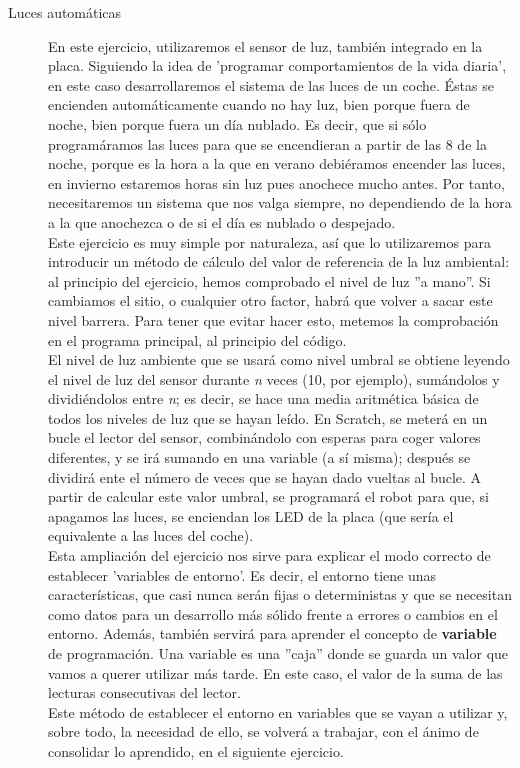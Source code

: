 \begin{description}
\item[Luces automáticas]\label{ej:lucesAuto}
En este ejercicio, utilizaremos el sensor de luz, también integrado en la placa. Siguiendo la idea de 'programar comportamientos de la vida diaria', en este caso desarrollaremos el sistema de las luces de un coche. Éstas se encienden automáticamente cuando no hay luz, bien porque fuera de noche, bien porque fuera un día nublado. Es decir, que si sólo programáramos las luces para que se encendieran a partir de las 8 de la noche, porque es la hora a la que en verano debiéramos encender las luces, en invierno estaremos horas sin luz pues anochece mucho antes. Por tanto, necesitaremos un sistema que nos valga siempre, no dependiendo de la hora a la que anochezca o de si el día es nublado o despejado. \\
Este ejercicio es muy simple por naturaleza, así que lo utilizaremos para introducir un método de cálculo del valor de referencia de la luz ambiental:
al principio del ejercicio, hemos comprobado el nivel de luz ''a mano''. Si cambiamos el sitio, o cualquier otro factor, habrá que volver a sacar este nivel barrera. Para tener que evitar hacer esto, metemos la comprobación en el programa principal, al principio del código. \\
El nivel de luz ambiente que se usará como nivel umbral se obtiene leyendo el nivel de luz del sensor durante \textit{n} veces (10, por ejemplo), sumándolos y dividiéndolos entre \textit{n}; es decir, se hace una media aritmética básica de todos los niveles de luz que se hayan leído. En Scratch, se meterá en un bucle el lector del sensor, combinándolo con esperas para coger valores diferentes, y se irá sumando en una variable (a sí misma); después se dividirá ente el número de veces que se hayan dado vueltas al bucle. A partir de calcular este valor umbral, se programará el robot para que, si apagamos las luces, se enciendan los LED de la placa (que sería el equivalente a las luces del coche).\\
Esta ampliación del ejercicio nos sirve para explicar el modo correcto de establecer 'variables de entorno'. Es decir, el entorno tiene unas características, que casi nunca serán fijas o deterministas y que se necesitan como datos para un desarrollo más sólido frente a errores o cambios en el entorno. Además, también servirá para aprender el concepto de \textbf{variable} de programación. Una variable es una ''caja'' donde se guarda un valor que vamos a querer utilizar más tarde. En este caso, el valor de la suma de las lecturas consecutivas del lector.\\
Este método de establecer el entorno en variables que se vayan a utilizar y, sobre todo, la necesidad de ello, se volverá a trabajar, con el ánimo de consolidar lo aprendido, en el siguiente ejercicio. 


\end{description}
